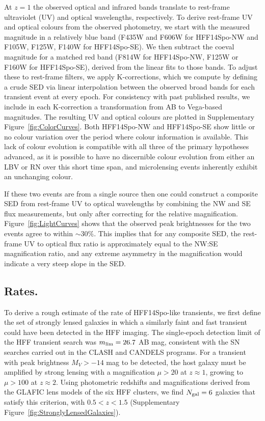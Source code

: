 \documentclass{article}
\providecommand\citep{\cite}
\def\spock{HFF14Spo\xspace}
\def\spockone{HFF14Spo-NW\xspace}
\def\spocktwo{HFF14Spo-SE\xspace}
\begin{document}
At $z=1$ the observed optical and infrared bands translate to
rest-frame ultraviolet (UV) and optical wavelengths, respectively.  To
derive rest-frame UV and optical colours from the observed photometry,
we start with the measured magnitude in a relatively blue band (F435W
and F606W for \spockone and F105W, F125W, F140W for \spocktwo).  We
then subtract the coeval magnitude for a matched red band (F814W for
\spockone, F125W or F160W for \spocktwo), derived from the linear fits
to those bands.  To adjust these to rest-frame filters, we apply 
K-corrections\citep{Hogg:2002}, which we compute by
defining a crude SED via linear interpolation between the observed
broad bands for each transient event at every epoch.  For consistency
with past published results, we include in each K-correction a
transformation from AB to Vega-based magnitudes.  The resulting UV and
optical colours are plotted in Supplementary Figure~\ref{fig:ColorCurves}.  Both
\spockone and \spocktwo show little or no colour variation over the
period where colour information is available.  This lack of colour
evolution is compatible with all three of the primary hypotheses
advanced, as it is possible to have no discernible colour evolution
from either an LBV or RN over this short time span, and microlensing
events inherently exhibit an unchanging colour.

If these two events are from a single source then one could construct
a composite SED from rest-frame UV to optical wavelengths by combining
the NW and SE flux measurements, but only after correcting for the
relative magnification.  Figure~\ref{fig:LightCurves}
shows that the observed peak brightnesses for the two events agree to
within $\sim30\%$.  This implies that for any composite SED, the
rest-frame UV to optical flux ratio is approximately equal to the
NW:SE magnification ratio, and any extreme asymmetry in the
magnification would indicate a very steep slope in the SED.

\subsection{Rates.}\label{sec:RatesMethods}


To derive a rough estimate of the rate of \spock-like transients, we
first define the set of strongly lensed galaxies in which a similarly
faint and fast transient could have been detected in the HFF
imaging. The single-epoch detection limit of the HFF transient search
was $m_{\rm lim}=26.7$ AB mag, consistent with the SN searches carried
out in the CLASH and CANDELS programs\cite{Graur:2014,Rodney:2014}.
For a transient with peak brightness $M_{V}>-14$ mag to be detected,
the host galaxy must be amplified by strong lensing with a
magnification $\mu>20$ at $z\approx1$, growing to $\mu>100$ at $z\approx2$.
Using photometric redshifts and magnifications derived from the GLAFIC
lens models of the six HFF clusters, we find $N_{\rm gal}=6$ galaxies
that satisfy this criterion, with $0.5<z<1.5$ (Supplementary
Figure~\ref{fig:StronglyLensedGalaxies}).
\end{document}
